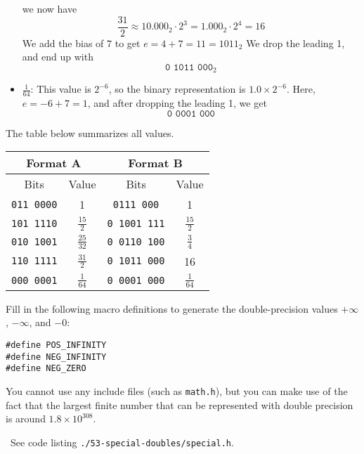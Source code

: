 \documentclass[12pt]{article}
\newenvironment{ex}[2][Exercise]{\begin{trivlist}
		\item[\hskip \labelsep {\bfseries #1}\hskip \labelsep {\bfseries #2.}]}{\end{trivlist}}
\newenvironment{sol}[1][Solution]{\begin{trivlist}
		\item[\hskip \labelsep {\bfseries #1:}]}{\end{trivlist}}
\begin{document}
\begin{sol}
\begin{itemize}
		we now have
		\[
		\frac{31}{2}\approx 10.000_2\cdot 2^{3}=1.000_2\cdot 2^{4}=16
		\]
		We add the bias of $7$ to get $e=4+7=11=1011_2$ We drop the leading 1, and end
		up with
		\[
		\texttt{0 1011 000}_2
		\]
		\item $\frac{1}{64}$: This value is $2^{-6}$, so the binary representation
		is $1.0\times 2^{-6}$. Here, $e=-6+7=1$, and after dropping the leading 1, we get
		\[
		\texttt{0 0001 000}
		\]
	\end{itemize}
	The table below summarizes all values.
	\begin{center}
		\def\arraystretch{1.25}
		\begin{tabular}{cc|cc}
			\multicolumn{2}{c}{Format A} & \multicolumn{2}{c}{Format B}\\
			\hline
			Bits & Value & Bits & Value\\
			\hline
			\texttt{011 0000} & 1 & \texttt{0111 000} & 1 \\
			
			\texttt{101 1110} & $\frac{15}{2}$ & \texttt{0 1001 111} & $\frac{15}{2}$\\
			
			\texttt{010 1001} & $\frac{25}{32}$ & \texttt{0 0110 100} & $\frac{3}{4}$\\
			
			\texttt{110 1111} & $\frac{31}{2}$ & \texttt{0 1011 000} & 16\\
			
			\texttt{000 0001} & $\frac{1}{64}$ & \texttt{0 0001 000} & $\frac{1}{64}$\\
		\end{tabular}
	\end{center}
\end{sol}

\begin{ex}{2.53}
	Fill in the following macro definitions to generate the double-precision values $+\infty$,
	$-\infty$, and $-0$:
	
	\begin{lstlisting}
#define POS_INFINITY
#define NEG_INFINITY
#define NEG_ZERO
	\end{lstlisting}
	You cannot use any include files (such as \texttt{math.h}), but you can make use of
	the fact that the largest finite number that can be represented with double precision
	is around $1.8\times 10^{308}$.
\end{ex}

\begin{sol}
	\
	See code listing \texttt{./53-special-doubles/special.h}.
	
\end{sol}
\end{document}
